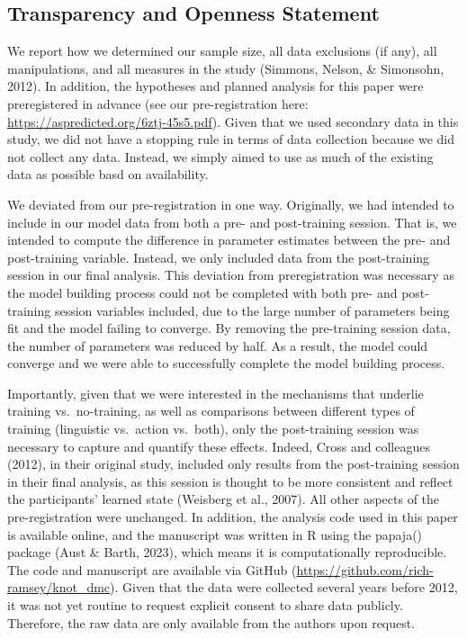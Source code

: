 \documentclass[
  man, donotrepeattitle,floatsintext]{apa6}
\begin{document}
\subsection{Transparency and Openness Statement}\label{transparency-and-openness-statement}

We report how we determined our sample size, all data exclusions (if any), all manipulations, and all measures in the study (Simmons, Nelson, \& Simonsohn, 2012). In addition, the hypotheses and planned analysis for this paper were preregistered in advance (see our pre-registration here: \url{https://aspredicted.org/6ztj-45s5.pdf}). Given that we used secondary data in this study, we did not have a stopping rule in terms of data collection because we did not collect any data. Instead, we simply aimed to use as much of the existing data as possible basd on availability.

We deviated from our pre-registration in one way. Originally, we had intended to include in our model data from both a pre- and post-training session. That is, we intended to compute the difference in parameter estimates between the pre- and post-training variable. Instead, we only included data from the post-training session in our final analysis. This deviation from preregistration was necessary as the model building process could not be completed with both pre- and post-training session variables included, due to the large number of parameters being fit and the model failing to converge. By removing the pre-training session data, the number of parameters was reduced by half. As a result, the model could converge and we were able to successfully complete the model building process.

Importantly, given that we were interested in the mechanisms that underlie training vs.~no-training, as well as comparisons between different types of training (linguistic vs.~action vs.~both), only the post-training session was necessary to capture and quantify these effects. Indeed, Cross and colleagues (2012), in their original study, included only results from the post-training session in their final analysis, as this session is thought to be more consistent and reflect the participants' learned state (Weisberg et al., 2007). All other aspects of the pre-registration were unchanged. In addition, the analysis code used in this paper is available online, and the manuscript was written in R using the papaja() package (Aust \& Barth, 2023), which means it is computationally reproducible. The code and manuscript are available via GitHub (\url{https://github.com/rich-ramsey/knot_dmc}). Given that the data were collected several years before 2012, it was not yet routine to request explicit consent to share data publicly. Therefore, the raw data are only available from the authors upon request.
\end{document}
